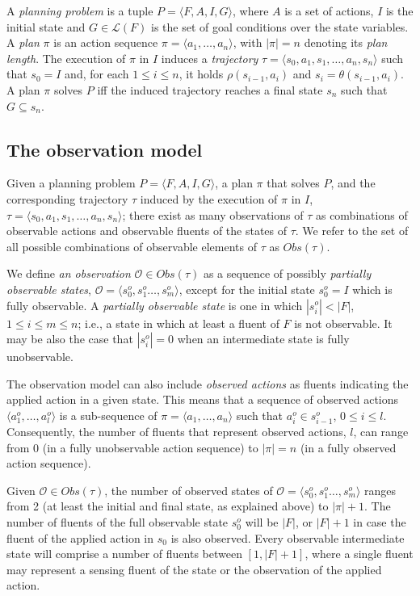 \documentclass[letterpaper]{article} %
\newcommand{\tup}[1]{{\langle #1 \rangle}}
\begin{document}
A {\em planning problem} is a tuple $P=\tup{F,A,I,G}$, where $A$ is a set of actions, $I$ is the initial state and $G\in\mathcal{L}(F)$ is the set of goal conditions over the state variables. A {\em plan} $\pi$ is an action sequence $\pi=\tup{a_1, \ldots, a_n}$, with $|\pi|=n$ denoting its {\em plan length}. The execution of $\pi$ in $I$ induces a {\em trajectory} $\tau=\tup{s_0, a_1, s_1, \ldots, a_n, s_n}$ such that $s_0=I$ and, for each {\small $1\leq i\leq n$}, it holds $\rho(s_{i-1},a_i)$ and $s_i=\theta(s_{i-1},a_i)$. A plan $\pi$ solves $P$ iff the induced trajectory reaches a final state $s_n$ such that $G \subseteq s_n$.


\subsection{The observation model}
Given a planning problem $P=\tup{F,A,I,G}$, a plan $\pi$ that solves $P$, and the corresponding trajectory $\tau$ induced by the execution of $\pi$ in $I$, $\tau=\tup{s_0, a_1, s_1, \ldots, a_n, s_n}$; there exist as many observations of $\tau$ as combinations of observable actions and observable fluents of the states of $\tau$. We refer to the set of all possible combinations of observable elements of $\tau$ as $Obs(\tau)$.

We define {\em an observation} $\mathcal{O}\in Obs(\tau)$ as a sequence of possibly {\em partially observable states}, $\mathcal{O}=\tup{s_0^o,s_1^o \ldots , s_m^o}$, except for the initial state $s_0^o=I$ which is fully observable. A {\em partially observable state} is one in which $|s_i^o| < |F|$, {\small $1\leq i\leq m\leq n$}; i.e., a state in which at least a fluent of $F$ is not observable. It may be also the case that $|s_i^o| = 0$ when an intermediate state is fully unobservable. 

The observation model can also include {\em observed actions} as fluents indicating the applied action in a given state. This means that a sequence of observed actions $\tup{a_1^o, \ldots, a_l^o}$ is a sub-sequence of $\pi=\tup{a_1, \ldots, a_n}$ such that $a_i^o \in s_{i-1}^o$, {\small $0\leq i \leq l$}. Consequently, the number of fluents that represent observed actions, $l$, can range from $0$ (in a fully unobservable action sequence) to $|\pi|=n$ (in a fully observed action sequence).

Given $\mathcal{O} \in Obs(\tau)$, the number of observed states of $\mathcal{O}=\tup{s_0^o,s_1^o \ldots , s_m^o}$ ranges from 2 (at least the initial and final state, as explained above) to $|\pi|+1$. The number of fluents of the full observable state $s_0^o$ will be $|F|$, or $|F|+1$ in case the fluent of the applied action in $s_0$ is also observed. Every observable intermediate state will comprise a number of fluents between $[1,|F|+1]$, where a single fluent may represent a sensing fluent of the state or the observation of the applied action.
\end{document}
